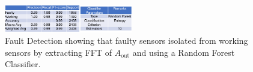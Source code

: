 \documentclass[manuscript,screen,review]{acmart} %
\newcommand{\aout}{$A_{\text{out}}$\xspace}
\providecommand{\DIFaddbegin}{} %
\providecommand{\DIFaddend}{} %
\providecommand{\DIFdelbegin}{} %
\providecommand{\DIFdelend}{} %
\providecommand{\DIFaddbeginFL}{} %
\providecommand{\DIFaddendFL}{} %
\providecommand{\DIFdelbeginFL}{} %
\providecommand{\DIFdelendFL}{} %
\newcommand{\DIFscaledelfig}{0.5}
\newlength{\DIFdelgraphicswidth} %
\newlength{\DIFdelgraphicsheight} %
\newcommand{\DIFaddincludegraphics}[2][]{{\color{blue}\fbox{\DIFOincludegraphics[#1]{#2}}}} %
\newcommand{\DIFdelincludegraphics}[2][]{%
\sbox{\DIFdelgraphicsbox}{\DIFOincludegraphics[#1]{#2}}%
\settoboxwidth{\DIFdelgraphicswidth}{\DIFdelgraphicsbox} %
\settoboxtotalheight{\DIFdelgraphicsheight}{\DIFdelgraphicsbox} %
\scalebox{\DIFscaledelfig}{%
\parbox[b]{\DIFdelgraphicswidth}{\usebox{\DIFdelgraphicsbox}\\[-\baselineskip] \rule{\DIFdelgraphicswidth}{0em}}\llap{\resizebox{\DIFdelgraphicswidth}{\DIFdelgraphicsheight}{%
\setlength{\unitlength}{\DIFdelgraphicswidth}%
\begin{picture}(1,1)%
\thicklines\linethickness{2pt} %
{\color[rgb]{1,0,0}\put(0,0){\framebox(1,1){}}}%
{\color[rgb]{1,0,0}\put(0,0){\line( 1,1){1}}}%
{\color[rgb]{1,0,0}\put(0,1){\line(1,-1){1}}}%
\end{picture}%
}\hspace*{3pt}}} %
} %
\DeclareRobustCommand{\DIFaddbegin}{\DIFOaddbegin \let\includegraphics\DIFaddincludegraphics} %
\DeclareRobustCommand{\DIFaddend}{\DIFOaddend \let\includegraphics\DIFOincludegraphics} %
\DeclareRobustCommand{\DIFdelbegin}{\DIFOdelbegin \let\includegraphics\DIFdelincludegraphics} %
\DeclareRobustCommand{\DIFdelend}{\DIFOaddend \let\includegraphics\DIFOincludegraphics} %
\DeclareRobustCommand{\DIFaddbeginFL}{\DIFOaddbeginFL \let\includegraphics\DIFaddincludegraphics} %
\DeclareRobustCommand{\DIFaddendFL}{\DIFOaddendFL \let\includegraphics\DIFOincludegraphics} %
\DeclareRobustCommand{\DIFdelbeginFL}{\DIFOdelbeginFL \let\includegraphics\DIFdelincludegraphics} %
\DeclareRobustCommand{\DIFdelendFL}{\DIFOaddendFL \let\includegraphics\DIFOincludegraphics} %
\begin{document}
\DIFdelbegin %
\DIFdelendFL \DIFaddbeginFL \begin{figure}
	\DIFaddendFL \centering
	\DIFdelbeginFL %
\DIFdelendFL \DIFaddbeginFL \includegraphics[width=0.5\textwidth]{figures/classification/FaultDetectionResults.png}
	\DIFaddendFL \caption{\footnotesize Fault Detection showing that faulty sensors isolated from working sensors by extracting FFT of \aout and using a Random Forest Classifier.}
	\label{fault_detection_results}
\DIFdelbeginFL %
\DIFdelend \DIFaddbegin \end{figure}
\DIFaddend 



%
\end{document}

